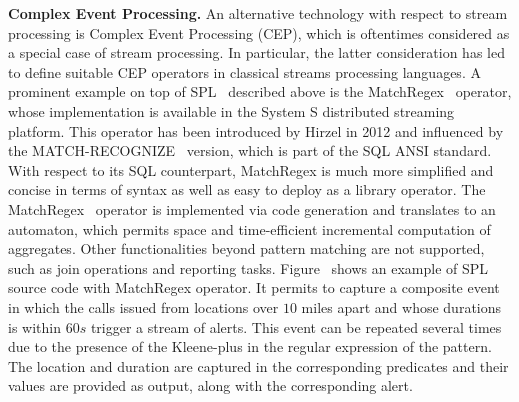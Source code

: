 
\textbf{Complex Event Processing.}
%
An alternative  technology with respect to stream processing is Complex Event Processing (CEP), which is oftentimes
considered as a special case of stream processing. In particular, the latter consideration has led to define suitable CEP
operators in classical streams processing languages. A prominent example on top of SPL~\cite{hirzel_schneider_gedik_2017} described above is the
MatchRegex~\cite{hirzel_2012} operator, whose implementation is available in the System S distributed streaming platform. This operator has been introduced by Hirzel in 2012 and influenced by the MATCH-RECOGNIZE~\cite{zemke_et_al_2007} version, which is part of the SQL ANSI
standard. With respect to its SQL counterpart,  MatchRegex is much more simplified and concise in terms of syntax as well as easy to deploy as a library operator. The MatchRegex~\cite{hirzel_2012} operator is implemented via code generation and translates to an automaton, which permits space and time-efficient incremental computation of aggregates. 
Other functionalities beyond pattern matching are not supported, such as join operations and reporting tasks.
Figure~\label{fig:cep} shows an example of SPL source code with MatchRegex operator.
It permits to capture a composite event in which the calls issued from locations over $10$ miles apart and whose durations is within $60s$ trigger 
a stream of alerts. This event can be repeated several times due to the presence of the Kleene-plus in the regular expression of the pattern. 
The location and duration are captured in the corresponding predicates and their values are provided as output, along with the corresponding alert. 
